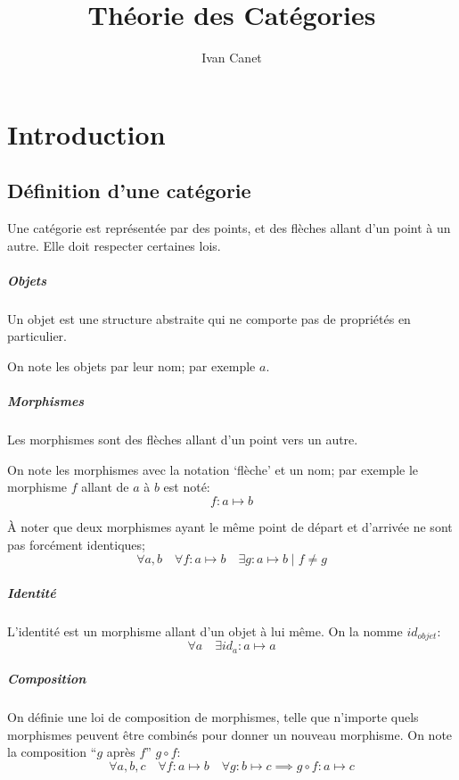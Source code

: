 \documentclass[a4paper,10pt,french,openany]{memoir}
\title{Théorie des Catégories}
\author{Ivan Canet}
\DeclareMathOperator\after{\circ}
\begin{document}
\maketitle
\tableofcontents

\chapter{Introduction}

\section{Définition d'une catégorie}

Une catégorie est représentée par des points, et des flèches allant d'un point à un autre. Elle doit respecter certaines lois.

\paragraph{Objets}
Un objet est une structure abstraite qui ne comporte pas de propriétés en particulier.

On note les objets par leur nom; par exemple $a$.

\paragraph{Morphismes}
Les morphismes sont des flèches allant d'un point vers un autre.

On note les morphismes avec la notation `flèche' et un nom; par exemple le morphisme $f$ allant de $a$ à $b$ est noté:
\[ f: a \mapsto b \]

À noter que deux morphismes ayant le même point de départ et d'arrivée ne sont pas forcément identiques;
\[ \forall a, b \quad \forall f: a \mapsto b \quad \exists g: a \mapsto b \;|\; f \neq g \]

\paragraph{Identité}
L'identité est un morphisme allant d'un objet à lui même. On la nomme $id_{objet}$:
\[ \forall a \quad \exists id_a: a \mapsto a \]

\paragraph{Composition}
On définie une loi de composition de morphismes, telle que n'importe quels morphismes peuvent être combinés pour donner un nouveau morphisme. On note la composition ``$g$ après $f$'' $g \after f$:
\[ \forall a,b,c \quad \forall f: a \mapsto b \quad \forall g: b \mapsto c \implies g \after f: a \mapsto c \]
\end{document}
